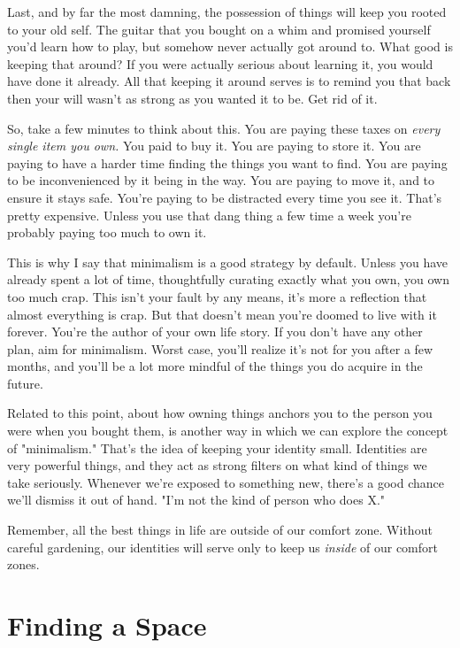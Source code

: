 \documentclass[]{book}
\begin{document}
Last, and by far the most damning, the possession of things will keep you rooted
to your old self. The guitar that you bought on a whim and promised yourself
you'd learn how to play, but somehow never actually got around to. What good is
keeping that around? If you were actually serious about learning it, you would
have done it already. All that keeping it around serves is to remind you that
back then your will wasn't as strong as you wanted it to be. Get rid of it.


So, take a few minutes to think about this. You are paying these taxes on
\emph{every single item you own.} You paid to buy it. You are paying to store
it. You are paying to have a harder time finding the things you want to find.
You are paying to be inconvenienced by it being in the way. You are paying to
move it, and to ensure it stays safe. You're paying to be distracted every time
you see it. That's pretty expensive. Unless you use that dang thing a few time a
week you're probably paying too much to own it.

This is why I say that minimalism is a good strategy by default. Unless you have
already spent a lot of time, thoughtfully curating exactly what you own, you own
too much crap. This isn't your fault by any means, it's more a reflection that
almost everything is crap. But that doesn't mean you're doomed to live with it
forever. You're the author of your own life story. If you don't have any other
plan, aim for minimalism. Worst case, you'll realize it's not for you after a
few months, and you'll be a lot more mindful of the things you do acquire in the
future.

Related to this point, about how owning things anchors you to the person you
were when you bought them, is another way in which we can explore the concept of
"minimalism." That's the idea of keeping your identity small. Identities are
very powerful things, and they act as strong filters on what kind of things we
take seriously. Whenever we're exposed to something new, there's a good chance
we'll dismiss it out of hand. "I'm not the kind of person who does X."

Remember, all the best things in life are outside of our comfort zone. Without
careful gardening, our identities will serve only to keep us \emph{inside} of
our comfort zones.



\chapter{Finding a Space}
\end{document}
